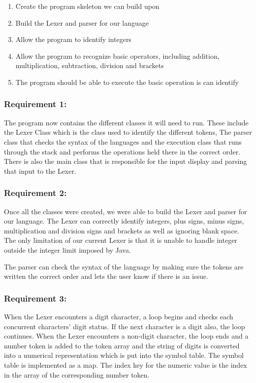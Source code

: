 \documentclass[a4paper, oneside, 11pt]{report}
\begin{document}
\begin{enumerate}
\item Create the program skeleton we can build upon 
\item Build the Lexer and parser for our language 
\item Allow the program to identify integers 
\item Allow the program to recognize basic operators, including addition, multiplication, subtraction, division and brackets 
\item The program should be able to execute the basic operation is can identify 
\end{enumerate}

\subsubsection{Requirement 1:}

The program now contains the different classes it will need to run. These include the Lexer Class which is the class used to identify the different tokens, The parser class that checks the syntax of the languages and the execution class that runs through the stack and performs the operations held there in the correct order. There is also the main class that is responsible for the input display and parsing that input to the Lexer. 

\subsubsection{Requirement 2:}

Once all the classes were created, we were able to build the Lexer and parser for our language. The Lexer can correctly identify integers, plus signs, minus signs, multiplication and division signs and brackets as well as ignoring blank space. The only limitation of our current Lexer is that it is unable to handle integer outside the integer limit imposed by Java. 

The parser can check the syntax of the language by making sure the tokens are written the correct order and lets the user know if there is an issue. 

\subsubsection{Requirement 3:}

When the Lexer encounters a digit character, a loop begins and checks each concurrent characters’ digit status. If the next character is a digit also, the loop continues. When the Lexer encounters a non-digit character, the loop ends and a number token is added to the token array and the string of digits is converted into a numerical representation which is put into the symbol table. The symbol table is implemented as a map. The index key for the numeric value is the index in the array of the corresponding number token. 
\end{document}
